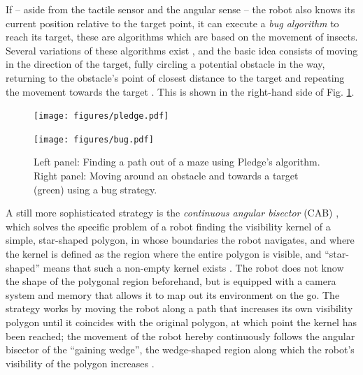 If -- aside from the tactile sensor and the angular sense -- the robot also knows
its current position relative to the target point, it can execute a \textit{bug algorithm}
to reach its target, these are algorithms which are based on the movement of insects.
Several variations of these algorithms exist \cite{Choset2010_ch2}, and the basic idea consists
of moving in the direction of the target, fully circling a potential obstacle in the way,
returning to the obstacle's point of closest distance to the target and repeating the movement
towards the target \cite[Ch. 7.3.1, pp. 323-326]{FUH_geo2020}.
This is shown in the right-hand side of Fig. \ref{fig:pledge_bug}.

\begin{figure}[htb]
	\begin{minipage}{0.5 \textwidth}
		\begin{center}
			\texttt{[image: figures/pledge.pdf]}
		\end{center}
	\end{minipage}
	\begin{minipage}{0.5 \textwidth}
		\begin{center}
			\texttt{[image: figures/bug.pdf]}
		\end{center}
	\end{minipage}
	\caption[Pledge and bug algorithms.]{
	Left panel: Finding a path out of a maze using Pledge's algorithm.
	Right panel: Moving around an obstacle and towards a target (green) using a bug strategy.}
	\label{fig:pledge_bug}
\end{figure}

A still more sophisticated strategy is the \textit{continuous angular bisector}
(CAB) \cite{Icking1995}, which solves the specific problem of a robot finding the visibility kernel
of a simple, star-shaped polygon, in whose boundaries the robot navigates, and where 
the kernel is defined as the region where the entire polygon is visible, and ``star-shaped'' 
means that such a non-empty kernel exists \cite[Ch. 7.4.5, pp. 347-351]{FUH_geo2020}.
The robot does not know the shape of the polygonal region beforehand, but is equipped
with a camera system and memory that allows it to map out its environment on the go.
The strategy works by moving the robot along a path that increases its own visibility
polygon until it coincides with the original polygon, at which point the kernel has been
reached; the movement of the robot hereby continuously follows the angular bisector of the
``gaining wedge'', the wedge-shaped region along which the robot's visibility of the
polygon increases \cite[p. 261]{Icking1995}.

